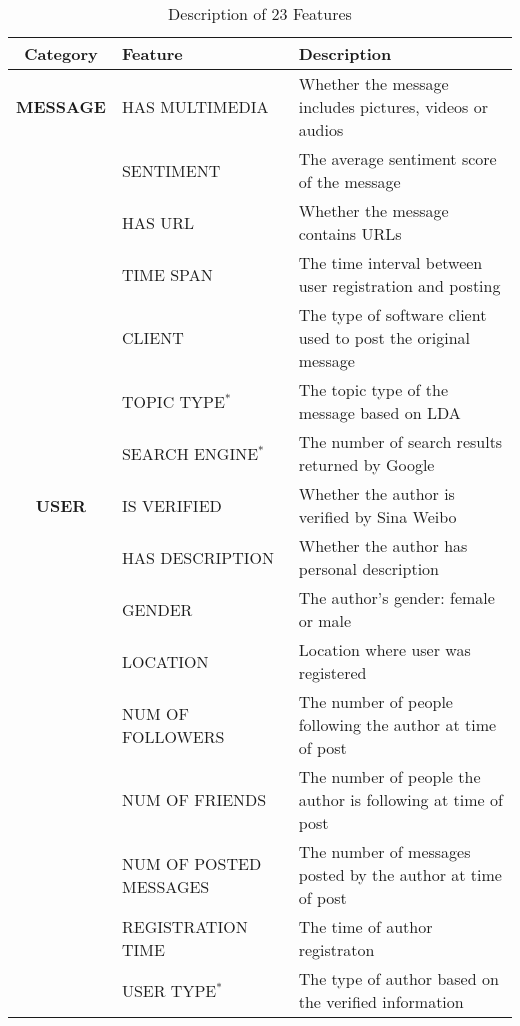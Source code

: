 \begin{table*}[th]
\centering
\small
\caption{Description of 23 Features}\label{table:features}
\begin{tabular}{@{}cll@{}}
\toprule
\textbf{Category}    & \textbf{Feature}      & \textbf{Description}                                         \\ \midrule
\textbf{MESSAGE}     & HAS MULTIMEDIA         & Whether the message includes pictures, videos or audios      \\
                     & SENTIMENT              & The average sentiment score of the message                   \\
                     & HAS URL                & Whether the message contains URLs                            \\
                     & TIME SPAN              & The time interval between user registration and posting \\
                     & CLIENT                 & The type of software client used to post the original message         \\
                     & TOPIC TYPE$^*$         & The topic type of the message based on LDA                   \\
\multicolumn{1}{l}{} & SEARCH ENGINE$^*$   & The number of search results returned by
Google \\ \midrule
\textbf{USER}        & IS VERIFIED           & Whether the author is verified by Sina Weibo                 \\
                     & HAS DESCRIPTION        & Whether the author has personal description                  \\
                     & GENDER                 & The author's gender: female or male                          \\
		     & LOCATION		      & Location where user was registered			     \\
                     & NUM OF FOLLOWERS       & The number of people following the author at time of post   \\
                     & NUM OF FRIENDS         & The number of people the author is following at time of post\\
                     & NUM OF POSTED MESSAGES & The number of messages posted by the author at time of post \\
                     & REGISTRATION TIME      & The time of author registraton\\
                     & USER TYPE$^*$          & The type of author based on the verified information         \\ \midrule

\end{tabular}
\end{table*}
